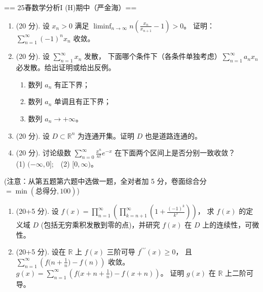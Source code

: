 == 25春数学分析I (H)期中（严金海）==
\begin{enumerate}
\item[一] (20 分). 设 $x_n>0$ 满足 $\displaystyle\liminf_{n \rightarrow \infty} n\left(\frac{x_n}{x_{n+1}}-1\right)>0$。
证明：$\displaystyle\sum_{n=1}^{\infty}(-1)^n x_n$ 收敛。

\item[二] (20 分). 设 $\displaystyle\sum_{n=1}^{\infty} x_n$ 发散，
下面哪个条件下（各条件单独考虑）$\displaystyle\sum_{n=1}^{\infty} a_n x_n$ 必发散。给出证明或给出反例。
\begin{enumerate}[label=(\arabic*)]
\item 数列 $a_n$ 有正下界；
\item 数列 $a_n$ 单调且有正下界；
\item 数列 $a_n \rightarrow+\infty$。
\end{enumerate}

\item[三] (20 分). 设 $D \subset \mathbb{R}^n$ 为连通开集。证明 $D$ 也是道路连通的。

\item[四] (20 分). 讨论级数 $\displaystyle\sum_{n=0}^{\infty} \frac{x^n}{n!} e^{-x}$ 在下面两个区间上是否分别一致收敛？\\
(1) $(-\infty, 0]$;\ \ (2) $[0, \infty)$。
\end{enumerate}
(注意：从第五题第六题中选做一题，全对者加 5 分，卷面综合分 $=\min(\text{总得分},100)$)
\begin{enumerate}
\item[五] (20+5 分). 设 $\displaystyle f(x)=\prod_{n=1}^{\infty}\left(\prod_{k=n+1}^{\infty}\left(1+\frac{(-1)^k}{k^x}\right)\right)$，
求 $f(x)$ 的定义域 $D$ (包括无穷乘积发散到零的点)，并研究 $f(x)$ 在 $D$ 上的连续性，可微性。

\item[六] (20+5 分). 设在 $\mathbb{R}$ 上 $f(x)$ 三阶可导 $f^{\prime \prime \prime}(x) \geq 0$，
且 $\displaystyle \sum_{n=1}^{\infty}\left(f\Big(n+\frac{1}{n}\Big)-f(n)\right)$ 收敛。
$\displaystyle g(x)=\sum_{n=1}^{\infty}\left(f\Big(x+n+\frac{1}{n}\Big)-f(x+n)\right)$。
证明 $g(x)$ 在 $\mathbb{R}$ 上二阶可导。
\end{enumerate}

